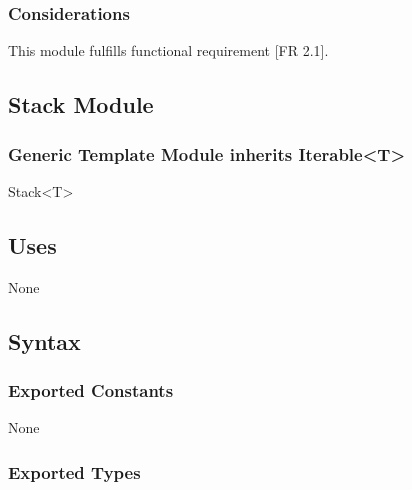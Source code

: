 \documentclass[12pt]{article}
\begin{document}
                \subsubsection*{Considerations}
                
                This module fulfills functional requirement [FR 2.1].
                
                \newpage
                 \subsection* {Stack Module}
                
                \subsubsection*{Generic Template Module inherits Iterable<T>}
                
                Stack<T>
                
                \subsection* {Uses}
                
                None
                
                \subsection* {Syntax}
                \subsubsection * {Exported Constants}
                
                None
                
                \subsubsection* {Exported Types}
            
\end{document}
